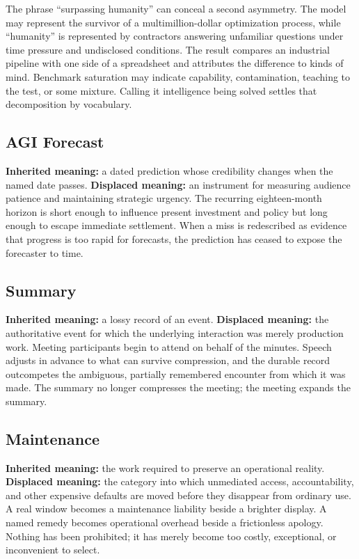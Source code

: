 \documentclass[11pt]{article}
\begin{document}
The phrase \enquote{surpassing humanity} can conceal a second asymmetry. The model may represent the survivor of a multimillion-dollar optimization process, while \enquote{humanity} is represented by contractors answering unfamiliar questions under time pressure and undisclosed conditions. The result compares an industrial pipeline with one side of a spreadsheet and attributes the difference to kinds of mind. Benchmark saturation may indicate capability, contamination, teaching to the test, or some mixture. Calling it intelligence being solved settles that decomposition by vocabulary.

\subsection*{AGI Forecast}

\textbf{Inherited meaning:} a dated prediction whose credibility changes when the named date passes. \textbf{Displaced meaning:} an instrument for measuring audience patience and maintaining strategic urgency. The recurring eighteen-month horizon is short enough to influence present investment and policy but long enough to escape immediate settlement. When a miss is redescribed as evidence that progress is too rapid for forecasts, the prediction has ceased to expose the forecaster to time.

\subsection*{Summary}

\textbf{Inherited meaning:} a lossy record of an event. \textbf{Displaced meaning:} the authoritative event for which the underlying interaction was merely production work. Meeting participants begin to attend on behalf of the minutes. Speech adjusts in advance to what can survive compression, and the durable record outcompetes the ambiguous, partially remembered encounter from which it was made. The summary no longer compresses the meeting; the meeting expands the summary.

\subsection*{Maintenance}

\textbf{Inherited meaning:} the work required to preserve an operational reality. \textbf{Displaced meaning:} the category into which unmediated access, accountability, and other expensive defaults are moved before they disappear from ordinary use. A real window becomes a maintenance liability beside a brighter display. A named remedy becomes operational overhead beside a frictionless apology. Nothing has been prohibited; it has merely become too costly, exceptional, or inconvenient to select.
\end{document}
